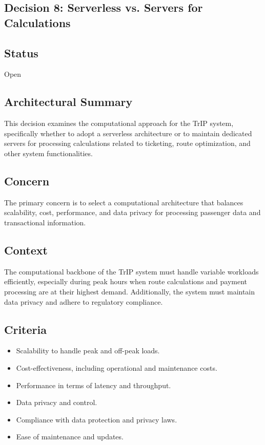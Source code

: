 \subsection{Decision 8: Serverless vs. Servers for Calculations}

\subsection*{Status}
Open

\subsection*{Architectural Summary}
This decision examines the computational approach for the TrIP system, specifically whether to adopt a serverless architecture or to maintain dedicated servers for processing calculations related to ticketing, route optimization, and other system functionalities.

\subsection*{Concern}
The primary concern is to select a computational architecture that balances scalability, cost, performance, and data privacy for processing passenger data and transactional information.

\subsection*{Context}
The computational backbone of the TrIP system must handle variable workloads efficiently, especially during peak hours when route calculations and payment processing are at their highest demand. Additionally, the system must maintain data privacy and adhere to regulatory compliance.

\subsection*{Criteria}
\begin{itemize}
    \item Scalability to handle peak and off-peak loads.
    \item Cost-effectiveness, including operational and maintenance costs.
    \item Performance in terms of latency and throughput.
    \item Data privacy and control.
    \item Compliance with data protection and privacy laws.
    \item Ease of maintenance and updates.
\end{itemize}

